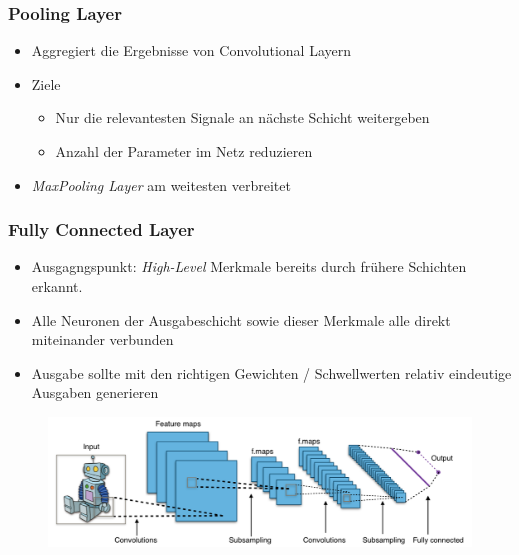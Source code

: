 \begin{frame}
\frametitle{Pooling Layer}

\begin{itemize}
\item Aggregiert die Ergebnisse von Convolutional Layern
\item Ziele
\begin{itemize}
	\item Nur die relevantesten Signale an nächste Schicht weitergeben
	\item Anzahl der Parameter im Netz reduzieren
\end{itemize}

\item \emph{MaxPooling Layer} am weitesten verbreitet
\end{itemize}



\end{frame}



\begin{frame}
\frametitle{Fully Connected Layer}

\begin{itemize}
\item Ausgagngspunkt: \emph{High-Level} Merkmale bereits durch frühere Schichten erkannt. 
\item Alle Neuronen der Ausgabeschicht sowie dieser Merkmale alle direkt miteinander verbunden
\item Ausgabe sollte mit den richtigen Gewichten / Schwellwerten relativ eindeutige Ausgaben generieren
\end{itemize}

\begin{figure}
	\includegraphics[width=.9\linewidth]{./aktuelleEntwicklung/convolutionalNN/img/cnn_overview_alpha}
\end{figure}


\end{frame}


